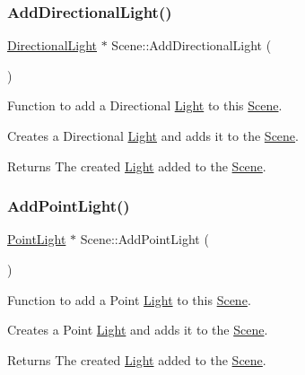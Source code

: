 \subsubsection{\texorpdfstring{Add\+Directional\+Light()}{AddDirectionalLight()}}
{\footnotesize\ttfamily \hyperlink{class_directional_light}{Directional\+Light} $\ast$ Scene\+::\+Add\+Directional\+Light (\begin{DoxyParamCaption}{ }\end{DoxyParamCaption})}



Function to add a Directional \hyperlink{class_light}{Light} to this \hyperlink{class_scene}{Scene}. 

Creates a Directional \hyperlink{class_light}{Light} and adds it to the \hyperlink{class_scene}{Scene}.

\begin{DoxyReturn}{Returns}
The created \hyperlink{class_light}{Light} added to the \hyperlink{class_scene}{Scene}. 
\end{DoxyReturn}
\mbox{\label{class_scene_ac33b9cc536096a447892f524802dd2ec}} 
\subsubsection{\texorpdfstring{Add\+Point\+Light()}{AddPointLight()}}
{\footnotesize\ttfamily \hyperlink{class_point_light}{Point\+Light} $\ast$ Scene\+::\+Add\+Point\+Light (\begin{DoxyParamCaption}{ }\end{DoxyParamCaption})}



Function to add a Point \hyperlink{class_light}{Light} to this \hyperlink{class_scene}{Scene}. 

Creates a Point \hyperlink{class_light}{Light} and adds it to the \hyperlink{class_scene}{Scene}.

\begin{DoxyReturn}{Returns}
The created \hyperlink{class_light}{Light} added to the \hyperlink{class_scene}{Scene}. 
\end{DoxyReturn}
\mbox{\label{class_scene_a5086a9e37b94c2dfb30dfacbee668c79}} 
